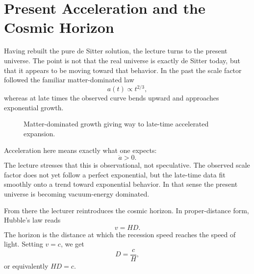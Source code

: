 \section{Present Acceleration and the Cosmic Horizon}

Having rebuilt the pure de Sitter solution, the lecture turns to the present universe. The point is not that the real universe is exactly de Sitter today, but that it appears to be moving toward that behavior. In the past the scale factor followed the familiar matter-dominated law
\begin{equation}
a(t)\propto t^{2/3},
\end{equation}
whereas at late times the observed curve bends upward and approaches exponential growth.

\begin{figure}[h]
\centering
{}
\caption{Matter-dominated growth giving way to late-time accelerated expansion.}
\end{figure}

Acceleration here means exactly what one expects:
\begin{equation}
\ddot a>0.
\end{equation}
The lecture stresses that this is observational, not speculative. The observed scale factor does not yet follow a perfect exponential, but the late-time data fit smoothly onto a trend toward exponential behavior. In that sense the present universe is becoming vacuum-energy dominated.

From there the lecturer reintroduces the cosmic horizon. In proper-distance form, Hubble's law reads
\begin{equation}
v=HD.
\end{equation}
The horizon is the distance at which the recession speed reaches the speed of light. Setting \(v=c\), we get
\begin{equation}
D=\frac{c}{H},
\end{equation}
or equivalently \(HD=c\).

